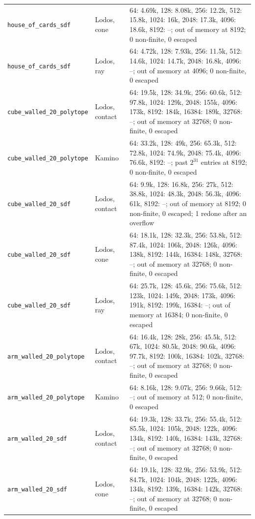 \begin{longtable}{@{}llp{9.5cm}@{}}
\texttt{house\_of\_cards\_sdf} & Lodos, cone & 64: 4.69k, 128: 8.08k, 256: 12.2k, 512: 15.8k, 1024: 16k, 2048: 17.3k, 4096: 18.6k, 8192: --; out of memory at 8192; 0 non-finite, 0 escaped \\
\texttt{house\_of\_cards\_sdf} & Lodos, ray & 64: 4.72k, 128: 7.93k, 256: 11.5k, 512: 14.6k, 1024: 14.7k, 2048: 16.8k, 4096: --; out of memory at 4096; 0 non-finite, 0 escaped \\
\texttt{cube\_walled\_20\_polytope} & Lodos, contact & 64: 19.5k, 128: 34.9k, 256: 60.6k, 512: 97.8k, 1024: 129k, 2048: 155k, 4096: 173k, 8192: 184k, 16384: 189k, 32768: --; out of memory at 32768; 0 non-finite, 0 escaped \\
\texttt{cube\_walled\_20\_polytope} & Kamino & 64: 33.2k, 128: 49k, 256: 65.3k, 512: 72.8k, 1024: 74.9k, 2048: 75.4k, 4096: 76.6k, 8192: --; past $2^{31}$ entries at 8192; 0 non-finite, 0 escaped \\
\texttt{cube\_walled\_20\_sdf} & Lodos, contact & 64: 9.9k, 128: 16.8k, 256: 27k, 512: 38.8k, 1024: 48.3k, 2048: 56.3k, 4096: 61k, 8192: --; out of memory at 8192; 0 non-finite, 0 escaped; 1 redone after an overflow \\
\texttt{cube\_walled\_20\_sdf} & Lodos, cone & 64: 18.1k, 128: 32.3k, 256: 53.8k, 512: 87.4k, 1024: 106k, 2048: 126k, 4096: 138k, 8192: 144k, 16384: 148k, 32768: --; out of memory at 32768; 0 non-finite, 0 escaped \\
\texttt{cube\_walled\_20\_sdf} & Lodos, ray & 64: 25.7k, 128: 45.6k, 256: 75.6k, 512: 123k, 1024: 149k, 2048: 173k, 4096: 191k, 8192: 199k, 16384: --; out of memory at 16384; 0 non-finite, 0 escaped \\
\texttt{arm\_walled\_20\_polytope} & Lodos, contact & 64: 16.4k, 128: 28k, 256: 45.5k, 512: 67k, 1024: 80.5k, 2048: 90.6k, 4096: 97.7k, 8192: 100k, 16384: 102k, 32768: --; out of memory at 32768; 0 non-finite, 0 escaped \\
\texttt{arm\_walled\_20\_polytope} & Kamino & 64: 8.16k, 128: 9.07k, 256: 9.66k, 512: --; out of memory at 512; 0 non-finite, 0 escaped \\
\texttt{arm\_walled\_20\_sdf} & Lodos, contact & 64: 19.3k, 128: 33.7k, 256: 55.4k, 512: 85.5k, 1024: 105k, 2048: 122k, 4096: 134k, 8192: 140k, 16384: 143k, 32768: --; out of memory at 32768; 0 non-finite, 0 escaped \\
\texttt{arm\_walled\_20\_sdf} & Lodos, cone & 64: 19.1k, 128: 32.9k, 256: 53.9k, 512: 84.7k, 1024: 104k, 2048: 122k, 4096: 134k, 8192: 139k, 16384: 142k, 32768: --; out of memory at 32768; 0 non-finite, 0 escaped \\

\end{longtable}
